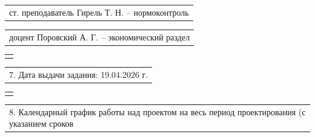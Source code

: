 \documentclass[12pt, А4, twoside]{article}
\begin{document}
\begin{FlushLeft}
    \vspace{-0.1 cm}

    \begin{tabular}{p{17.25cm}}
        \hspace{0.3cm} \textsf{ст. преподаватель Гирель Т. Н.} \hspace{4.065cm} \textsf{{--} нормоконтроль} \vspace{0pt} \hline \\
    \end{tabular}

    \vspace{-0.1 cm}

    \begin{tabular}{p{17.25cm}}
        \hspace{0.3cm} \textsf{доцент Поровский А. Г.} \hspace{0.5cm} \textsf{{--} экономический раздел}\vspace{0pt} \hline \\
    \end{tabular}

    \begin{tabular}{p{17.25cm}}
        \vspace{0pt} \hline \\
    \end{tabular}

    \vspace{-0.1 cm}

    \begin{tabular}{p{17.25cm}}
        \textsf{7. Дата выдачи задания: 19.04.2026 г.} \vspace{0pt} \hline
    \end{tabular}

    \begin{tabular}{p{17.25cm}}
        \vspace{0pt} \hline \\
    \end{tabular}

    \vspace{-0.1 cm}

    \begin{tabular}{p{17.25cm}}
        \textsf{8. Календарный график работы над проектом на весь период проектирования (с указанием сроков} \vspace{0pt} \hline \\
    \end{tabular}

    \vspace{-0.1 cm}


\end{FlushLeft}
\end{document}

